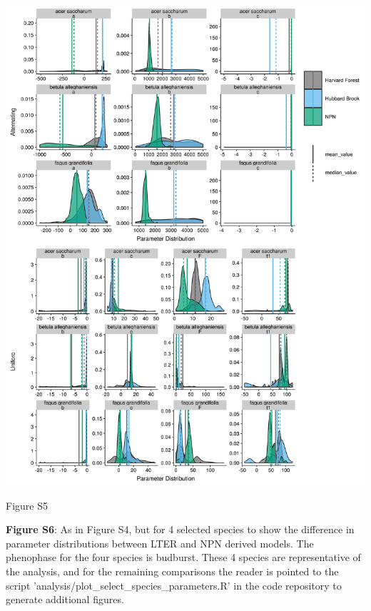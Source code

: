 \documentclass[a4paper,12pt]{article}
\begin{document}
\begin{center}
	\centering
		\includegraphics[scale=0.5]{supplement_hubbard_harvard_comparison2.png}
	\caption{Figure S5}
\end{center}

\newpage

\textbf{Figure S6}: As in Figure S4, but for 4 selected species to show the difference in parameter distributions between LTER and NPN derived models. The phenophase for the four species is budburst. These 4 species are representative of the analysis, and for the remaining comparisons the reader is pointed to the script 'analysis/plot\_select\_species\_parameters.R' in the code repository to generate additional figures.

\newpage
\end{document}
